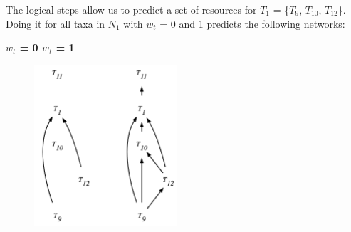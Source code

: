 The logical steps allow us to predict a set of resources for $T_1$ = \{$T_9$, $T_{10}$, $T_{12}$\}. Doing it for all taxa in $N_1$ with $w_t$ = 0 and 1 predicts the following networks:
\bigskip

\centerline{\textbf{$w_t$ = 0 \quad \quad \quad \quad \quad $w_t$ = 1} \quad}
    \begin{figure}[H]
    \centering\includegraphics[height = 6cm]{./figures/ch2-example.png}
    \end{figure}


